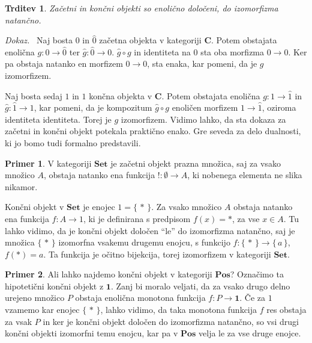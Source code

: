 \documentclass[12pt,a4paper]{book}
\theoremstyle{definition}
\theoremstyle{plain}
\newtheorem{trditev}[definicija]{Trditev}
\newenvironment{dokaz}{\emph{Dokaz.}\ }{\hspace{\fill}{$\Box$}}
\theoremstyle{definition}
\newtheorem{primer}{Primer}[section]
\theoremstyle{remark}
\newcommand{\cat}[1]{\textbf{#1}}
\renewcommand{\set}[1]{\{\,#1\,\}}
\begin{document}
\begin{trditev}
Začetni in končni objekti so enolično določeni, do izomorfizma natančno.
\end{trditev}
\begin{dokaz}
Naj bosta $0$ in $\hat{0}$ začetna objekta v kategoriji $\cat{C}$. Potem obstajata enolična $g : 0 \to \hat{0}$ ter $\hat{g} : \hat{0} \to 0$. $\hat{g} \circ g$ in identiteta na $0$ sta oba morfizma $0 \to 0$. Ker pa obstaja natanko en morfizem $0 \to 0$, sta enaka, kar pomeni, da je $g$ izomorfizem.

Naj bosta sedaj $1$ in $\hat{1}$ končna objekta v $\cat{C}$. Potem obstajata enolična $g : 1 \to \hat{1}$ in $\hat{g} : \hat{1} \to 1$, kar pomeni, da je kompozitum $\hat{g} \circ g$ enoličen morfizem $1 \to \hat{1}$, oziroma identiteta identiteta. Torej je $g$ izomorfizem.
\end{dokaz}
Vidimo lahko, da sta dokaza za začetni in končni objekt potekala praktično enako. Gre seveda za delo dualnosti, ki jo bomo tudi formalno predstavili.

\begin{primer}
V kategoriji $\cat{Set}$ je začetni objekt prazna množica, saj za vsako množico $A$, obstaja natanko ena funkcija $! : \emptyset \to A$, ki nobenega elementa ne slika nikamor. 

Končni objekt v $\cat{Set}$ je enojec $1 = \set{*}$. Za vsako množico $A$ obstaja natanko ena funkcija $f : A \to 1$, ki je definirana s predpisom $f(x) = *$, za vse $x \in A$. Tu lahko vidimo, da je končni objekt določen "`le"' do izomorfizma natančno, saj je množica $\set{*}$ izomorfna vsakemu drugemu enojcu, s funkcijo $f : \set{*} \to \set{a}$, $f(*) = a$. Ta funkcija je očitno bijekcija, torej izomorfizem v kategoriji $\cat{Set}$.
\end{primer}


\begin{primer}
Ali lahko najdemo končni objekt v kategoriji $\cat{Pos}$? Označimo ta hipotetični končni objekt z $\textbf{1}$. Zanj bi moralo veljati, da za vsako drugo delno urejeno množico $P$ obstaja enolična monotona funkcija $f : P \to \textbf{1}$. Če za $1$ vzamemo kar enojec $\set{*}$, lahko vidimo, da taka monotona funkcija $f$ res obstaja za vsak $P$ in ker je končni objekt določen do izomorfizma natančno, so vsi drugi končni objekti izomorfni temu enojcu, kar pa v $\cat{Pos}$ velja le za vse druge enojce.
\end{primer}
\end{document}
